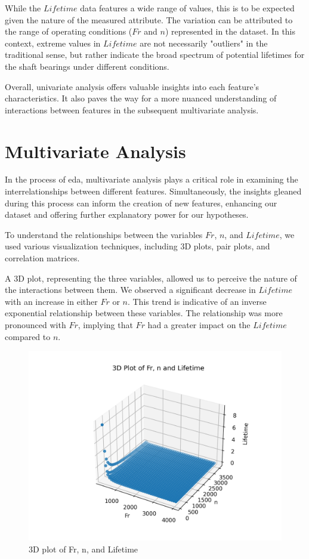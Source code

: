 While the $Lifetime$ data features a wide range of values, this is to be expected given the nature of the measured attribute. The variation can be attributed to the range of operating conditions ($Fr$ and $n$) represented in the dataset. In this context, extreme values in $Lifetime$ are not necessarily "outliers" in the traditional sense, but rather indicate the broad spectrum of potential lifetimes for the shaft bearings under different conditions.

Overall, univariate analysis offers valuable insights into each feature's characteristics. It also paves the way for a more nuanced understanding of interactions between features in the subsequent multivariate analysis.


\section{Multivariate Analysis}

In the process of \ac{eda}, multivariate analysis plays a critical role in examining the interrelationships between different features. Simultaneously, the insights gleaned during this process can inform the creation of new features, enhancing our dataset and offering further explanatory power for our hypotheses.

To understand the relationships between the variables $Fr$, $n$, and $Lifetime$, we used various visualization techniques, including 3D plots, pair plots, and correlation matrices.

A 3D plot, representing the three variables, allowed us to perceive the nature of the interactions between them. We observed a significant decrease in $Lifetime$ with an increase in either $Fr$ or $n$. This trend is indicative of an inverse exponential relationship between these variables. The relationship was more pronounced with $Fr$, implying that $Fr$ had a greater impact on the $Lifetime$ compared to $n$.

\begin{figure}[ht]
    \centering
    \includegraphics[width=\textwidth]{assets/bearings-eda/3dplot.png}
    \caption{3D plot of Fr, n, and Lifetime}
    \label{fig:bearings-3dplot}
\end{figure}

